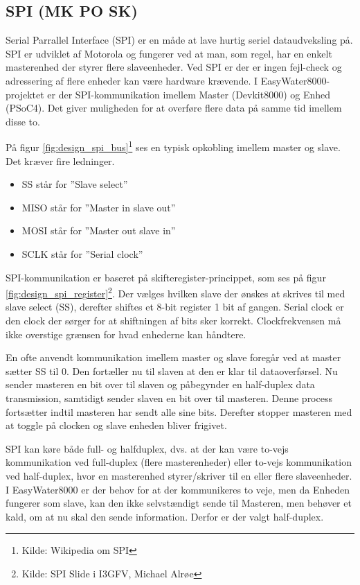 \subsection{SPI (MK PO SK)}

Serial Parrallel Interface (SPI) er en måde at lave hurtig seriel dataudveksling på. SPI er udviklet af Motorola og fungerer ved at man, som regel, har en enkelt masterenhed der styrer flere slaveenheder. Ved SPI er der er ingen fejl-check og adressering af flere enheder kan være hardware krævende. I EasyWater8000-projektet er der SPI-kommunikation imellem Master (Devkit8000) og Enhed (PSoC4). Det giver muligheden for at overføre flere data på samme tid imellem disse to.


På figur \ref{fig:design_spi_bus}\footnote{Kilde: Wikipedia om SPI} ses en typisk opkobling imellem master og slave. Det kræver fire ledninger.

\begin{itemize}
 	\item SS står for ''Slave select''
 	\item MISO står for ''Master in slave out''
 	\item MOSI står for ''Master out slave in''
	\item SCLK står for ''Serial clock''
\end{itemize}

SPI-kommunikation er baseret på skifteregister-princippet, som ses på figur \ref{fig:design_spi_register}\footnote{Kilde: SPI Slide i I3GFV, Michael Alrøe}. Der vælges hvilken slave der ønskes at skrives til med slave select (SS), derefter shiftes et 8-bit register 1 bit af gangen. Serial clock er den clock der sørger for at shiftningen af bits sker korrekt. Clockfrekvensen må ikke overstige grænsen for hvad enhederne kan håndtere.


En ofte anvendt kommunikation imellem master og slave foregår ved at master sætter SS til 0. Den fortæller nu til slaven at den er klar til 
dataoverførsel. Nu sender masteren en bit over til slaven og påbegynder en half-duplex data transmission, samtidigt sender slaven en bit over til masteren. Denne process fortsætter indtil masteren har sendt alle sine bits. Derefter stopper masteren med at toggle på clocken og slave enheden bliver frigivet.

SPI kan køre både full- og halfduplex, dvs. at der kan være to-vejs kommunikation ved full-duplex (flere masterenheder) eller to-vejs kommunikation ved half-duplex, hvor en masterenhed styrer/skriver til en eller flere slaveenheder. I EasyWater8000 er der behov for at der kommunikeres to veje, men da Enheden fungerer som slave, kan den ikke selvstændigt sende til Masteren, men behøver et kald, om at nu skal den sende information. Derfor er der valgt half-duplex.